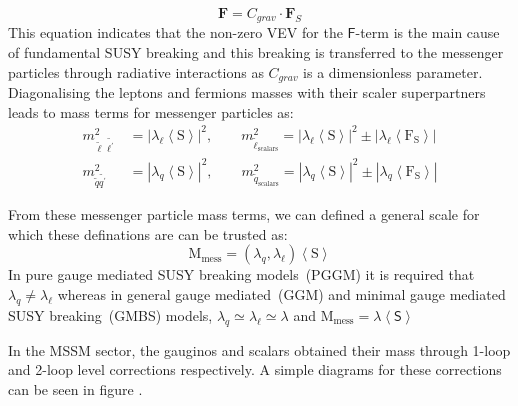 {\begin{equation}\label{lt}
\mathbf{F} = C_{grav}\cdot\mathbf{F}_{S}
\end{equation}
This equation indicates that the non-zero VEV for the $\mathsf{F}$-term is the main cause of fundamental SUSY breaking and this breaking is transferred to the messenger particles through radiative interactions as $C_{grav}$ is a dimensionless parameter.
Diagonalising the leptons and fermions masses with their scaler superpartners leads to mass terms for messenger particles as:
\begin{align}
m^{2}_{\tilde{\ell}\tilde{\ell^{\prime}}} &= |\lambda_{\ell}\left\langle \mathrm{S} \right\rangle|^{2}, \quad \quad  m^{2}_{\tilde{\ell}_{\mbox{scalars}}} = |\lambda_{\ell}\left\langle \mathrm{S} \right\rangle|^{2} \pm |\lambda_{\ell}\left\langle \mathrm{F_{S}} \right\rangle |
\\
m^{2}_{\tilde{q}\tilde{q^{\prime}}} &= |\lambda_{q}\left\langle \mathrm{S} \right\rangle|^{2}, \quad \quad  m^{2}_{\tilde{q}_{\mbox{scalars}}} = |\lambda_{q}\left\langle \mathrm{S} \right\rangle|^{2} \pm |\lambda_{q}\left\langle \mathrm{F_{S}} \right\rangle |
\end{align}

From these messenger particle mass terms, we can defined a general scale for which these definations are can be trusted as:
\begin{equation}\label{Mmess}
\mathrm{M}_{\mbox{mess}} = (\lambda_{q},\lambda_{\ell}) \left\langle \mathrm{S} \right\rangle 
\end{equation}
In pure gauge mediated SUSY breaking models~(PGGM) it is required that $\lambda_{q} \neq \lambda_{\ell}$ \cite{khoze} whereas in general gauge mediated~(GGM) and minimal gauge mediated SUSY breaking~(GMBS)\cite{gunion} models, $\lambda_{q} \simeq \lambda_{\ell} \simeq \lambda $ and $\mathrm{M}_{\mbox{mess}} = \lambda \left\langle \mathsf{S} \right\rangle $

In the MSSM sector, the gauginos and scalars obtained their mass through 1-loop and 2-loop level corrections respectively.
A simple diagrams for these corrections can be seen in figure \label{figMass}.


}
